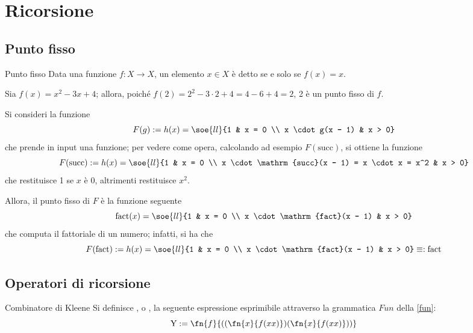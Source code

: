 \documentclass[a4paper, 12pt]{report}
\begin{document}
    \section{Ricorsione}

    \subsection{Punto fisso}

    \begin{frameddefn}{Punto fisso}
        Data una funzione $f: X \to X$, un elemento $x \in X$ è detto  se e solo se $f(x) = x$.
    \end{frameddefn}

    \begin{example}
        Sia $f(x) = x^2 -3x +4$; allora, poiché $f(2) = 2^2 - 3 \cdot 2 + 4 = 4 - 6 + 4 = 2$, 2 è un punto fisso di $f$.
    \end{example}

    \begin{example}
        Si consideri la funzione $$F(g) := h(x) = \soe{ll}{1 & x = 0 \\ x \cdot g(x - 1) & x > 0}$$ che prende in input una funzione; per vedere come opera, calcolando ad esempio $F(\mathrm{succ})$, si ottiene la funzione $$F(\mathrm{succ}) := h(x) = \soe{ll}{1 & x = 0 \\ x \cdot \mathrm{succ}(x - 1) = x \cdot x = x^2 & x > 0}$$ che restituisce 1 se $x$ è 0, altrimenti restituisce $x^2$.

        Allora, il punto fisso di $F$ è la funzione seguente $$\mathrm{fact}(x) = \soe{ll}{1 & x = 0 \\ x \cdot \mathrm{fact}(x - 1) & x > 0}$$ che computa il fattoriale di un numero; infatti, si ha che $$F(\mathrm{fact}) := h(x) = \soe{ll}{1 & x = 0 \\ x \cdot \mathrm{fact}(x - 1) & x > 0} \equiv : \mathrm{fact}$$
    \end{example}

    \subsection{Operatori di ricorsione}

    \begin{frameddefn}{Combinatore di Kleene}
        Si definisce , o , la seguente espressione esprimibile attraverso la grammatica $Fun$ della \cref{fun}: $$\mathrm Y := \fn{f}{((\fn{x}{f(xx)})(\fn{x}{f(xx)}))}$$
    \end{frameddefn}
\end{document}
